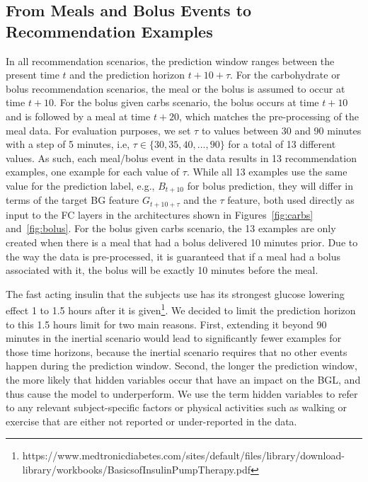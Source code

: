 \documentclass[journal,article,submit,moreauthors,pdftex]{Definitions/mdpi}
\begin{document}
\subsection{From Meals and Bolus Events to Recommendation Examples}
\label{sec:examples}

In all recommendation scenarios, the prediction window ranges between the present time $t$ and the prediction horizon $t + 10 + \tau$. For the carbohydrate or bolus recommendation scenarios, the meal or the bolus is assumed to occur at time $t +10$. For the bolus given carbs scenario, the bolus occurs at time $t+10$ and is followed by a meal at time $t+20$, which matches the pre-processing of the meal data. For evaluation purposes, we set $\tau$ to values between 30 and 90 minutes with a step of 5 minutes, i.e, $\tau \in \{30, 35, 40, ..., 90\}$ for a total of 13 different values. As such, each meal/bolus event in the data results in 13 recommendation examples, one example for each value of $\tau$. While all 13 examples use the same value for the prediction label, e.g., $B_{t + 10}$ for bolus prediction, they will differ in terms of the target BG feature $G_{t + 10 + \tau}$ and the $\tau$ feature, both used directly as input to the FC layers in the architectures shown in Figures~\ref{fig:carbs} and~\ref{fig:bolus}. For the bolus given carbs scenario, the 13 examples are only created when there is a meal that had a bolus delivered 10 minutes prior. Due to the way the data is pre-processed, it is guaranteed that if a meal had a bolus associated with it, the bolus will be exactly 10 minutes before the meal.

The fast acting insulin that the subjects use has its strongest glucose lowering effect 1 to 1.5 hours after it is given\footnote{https://www.medtronicdiabetes.com/sites/default/files/library/download-library/workbooks/BasicsofInsulinPumpTherapy.pdf}. We decided to limit the prediction horizon to this 1.5 hours limit for two main reasons. First, extending it beyond 90 minutes in the inertial scenario would lead to significantly fewer examples for those time horizons, because the inertial scenario requires that no other events happen during the prediction window. Second, the longer the prediction window, the more likely that hidden variables occur that have an impact on the BGL, and thus cause the model to underperform. We use the term hidden variables to refer to any relevant subject-specific factors or physical activities such as walking or exercise that are either not reported or under-reported in the data.
\end{document}
